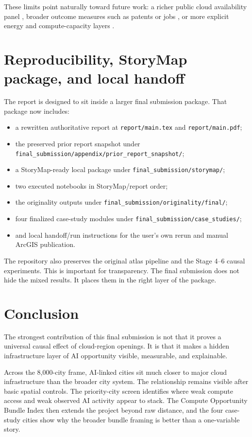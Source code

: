 \documentclass[11pt]{article}
\begin{document}
These limits point naturally toward future work: a richer public cloud availability panel \citep{oecd2025compute,oecd2023compute}, broader outcome measures such as patents or jobs \citep{aiindex2025}, or more explicit energy and compute-capacity layers \citep{iea2025energyai,sevilla2022}.

\section{Reproducibility, StoryMap package, and local handoff}
The report is designed to sit inside a larger final submission package. That package now includes:
\begin{itemize}[leftmargin=*]
  \item a rewritten authoritative report at \texttt{report/main.tex} and \texttt{report/main.pdf};
  \item the preserved prior report snapshot under \texttt{final\_submission/appendix/prior\_report\_snapshot/};
  \item a StoryMap-ready local package under \texttt{final\_submission/storymap/};
  \item two executed notebooks in StoryMap/report order;
  \item the originality outputs under \texttt{final\_submission/originality/final/};
  \item four finalized case-study modules under \texttt{final\_submission/case\_studies/};
  \item and local handoff/run instructions for the user’s own rerun and manual ArcGIS publication.
\end{itemize}

The repository also preserves the original atlas pipeline and the Stage 4--6 causal experiments. This is important for transparency. The final submission does not hide the mixed results. It places them in the right layer of the package.

\section{Conclusion}
The strongest contribution of this final submission is not that it proves a universal causal effect of cloud-region openings. It is that it makes a hidden infrastructure layer of AI opportunity visible, measurable, and explainable.

Across the 8,000-city frame, AI-linked cities sit much closer to major cloud infrastructure than the broader city system. The relationship remains visible after basic spatial controls. The priority-city screen identifies where weak compute access and weak observed AI activity appear to stack. The Compute Opportunity Bundle Index then extends the project beyond raw distance, and the four case-study cities show why the broader bundle framing is better than a one-variable story.
\end{document}
